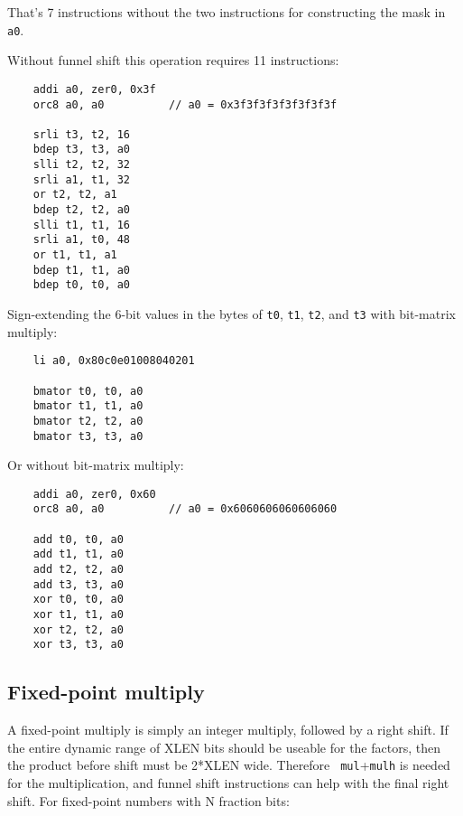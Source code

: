 That's 7 instructions without the two instructions for constructing the mask in {\tt a0}.

Without funnel shift this operation requires 11 instructions:

\begin{minipage}{\linewidth}
\begin{verbatim}
    addi a0, zer0, 0x3f
    orc8 a0, a0          // a0 = 0x3f3f3f3f3f3f3f3f

    srli t3, t2, 16
    bdep t3, t3, a0
    slli t2, t2, 32
    srli a1, t1, 32
    or t2, t2, a1
    bdep t2, t2, a0
    slli t1, t1, 16
    srli a1, t0, 48
    or t1, t1, a1
    bdep t1, t1, a0
    bdep t0, t0, a0
\end{verbatim}
\end{minipage}

Sign-extending the 6-bit values in the bytes of {\tt t0}, {\tt t1}, {\tt t2}, and {\tt t3} with bit-matrix multiply:

\begin{minipage}{\linewidth}
\begin{verbatim}
    li a0, 0x80c0e01008040201

    bmator t0, t0, a0
    bmator t1, t1, a0
    bmator t2, t2, a0
    bmator t3, t3, a0
\end{verbatim}
\end{minipage}

Or without bit-matrix multiply:

\begin{minipage}{\linewidth}
\begin{verbatim}
    addi a0, zer0, 0x60
    orc8 a0, a0          // a0 = 0x6060606060606060

    add t0, t0, a0
    add t1, t1, a0
    add t2, t2, a0
    add t3, t3, a0
    xor t0, t0, a0
    xor t1, t1, a0
    xor t2, t2, a0
    xor t3, t3, a0
\end{verbatim}
\end{minipage}

\subsection{Fixed-point multiply}

A fixed-point multiply is simply an integer multiply, followed by a right
shift. If the entire dynamic range of XLEN bits should be useable for the
factors, then the product before shift must be 2*XLEN wide. Therefore {\tt
mul}+{\tt mulh} is needed for the multiplication, and funnel shift instructions
can help with the final right shift. For fixed-point numbers with N fraction
bits:

